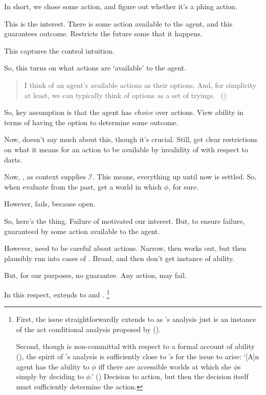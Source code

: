 \begin{note}
  In short, we chose some action, and figure out whether it's a phing action.

  This is the interest.
  There is some action available to the agent, and this guarantees outcome.
  Restricts the future some that it happens.

  This captures the control intuition.

  So, this turns on what actions are `available' to the agent.
  \begin{quote}
    I think of an agent's available actions as their options.
    And, for simplicity at least, we can typically think of options as a set of tryings.\newline
    \mbox{ }\hfill\mbox{(\citeyear[14]{Boylan:2020aa})}
  \end{quote}

  So, key assumption is that the agent has \emph{choice} over actions.
  View ability in terms of having the option to determine some outcome.

  Now, \citeauthor{Boylan:2020aa} doesn't say much about this, though it's crucial.
  Still, get clear restrictions on what it means for an action to be available by invalidity of \BoyVS{} with respect to darts.
\end{note}


\begin{note}
  Now, \BoyPS{}, as context supplies \(\mathcal{I}\).
  This means, everything up until now is settled.
  So, when evaluate from the past, get a world in which \(\phi\), for sure.

  However, \BoyVS{} fails, because open.

  So, here's the thing.
  Failure of \BoyVS{} motivated our interest.
  But, to ensure failure, guaranteed by some action available to the agent.

  However, need to be careful about actions.
  Narrow, then works out, but then plausibly run into cases of \BoyVS{}.
  Broad, and then don't get instance of ability.

  But, for our purposes, no guarantee.
  Any action, may fail.

  In this respect, extends to \textcite{Mandelkern:2017aa} and \textcite{Schwarz:2020aa}.%
  \footnote{
    First, the issue straightforwardly extends to \citeauthor{Mandelkern:2017aa} as \citeauthor{Boylan:2020aa}'s analysis just is an instance of the act conditional analysis proposed by \citeauthor{Mandelkern:2017aa} (\citeyear[cf.][\S5]{Mandelkern:2017aa}).

    Second, though \citeauthor{Schwarz:2020aa} is non-committal with respect to a formal account of ability (\citeyear[cf.][13]{Schwarz:2020aa}), the spirit of \citeauthor{Schwarz:2020aa}'s analysis is sufficiently close to \citeauthor{Boylan:2020aa}'s for the issue to arise:
    `[A]n agent has the ability to \(\phi\) iff there are accessible worlds at which she \(\phi\)s simply by deciding to \(\phi\).' (\citeyear[19]{Schwarz:2020aa})
    Decision to action, but then the decision itself must sufficiently determine the action.
  }
\end{note}

